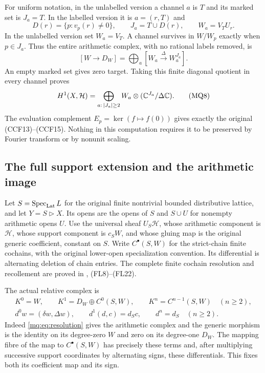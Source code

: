 For uniform notation, in the unlabelled version a channel $a$ is
$T$ and its marked set is $J_a=T$. In the labelled version it is
$a=(r,T)$ and
\[
 D(r)=\{p:v_p(r)\ne0\},\qquad J_a=T\cup D(r),
 \qquad W_a=V_TU_r.
 \tag{MQ6}\label{mq:eq:marked-set}
\]
In the unlabelled version set $W_a=V_T$. A channel survives in
$W/W_p$ exactly when $p\in J_a$. Thus the entire arithmetic
complex, with no rational labels removed, is
\[
 [W\longrightarrow D_W]
   =\bigoplus_a[W_a\xrightarrow{\Delta}W_a^{J_a}].
 \tag{MQ7}\label{mq:eq:channel-complex}
\]
An empty marked set gives zero target. Taking this finite diagonal
quotient in every channel proves
\[
 H^1(X,\mathcal H)
   =\bigoplus_{a:\,|J_a|\ge2}
       W_a\otimes(\mathbb C^{J_a}/\Delta\mathbb C).
 \tag{MQ8}\label{mq:eq:full-mixed-cohomology}
\]
The evaluation complement $E_p=\ker(f\mapsto f(0))$ gives exactly
the original (CCF13)--(CCF15). Nothing in this computation requires
it to be preserved by Fourier transform or by nonunit scaling.

\subsection{The full support extension and the arithmetic image}

Let $S=\operatorname{Spec}_{\rm Lat} L$ for the original finite nontrivial bounded
distributive lattice, and let $Y=S\triangleright X$. Its opens are
the opens of $S$ and $S\cup U$ for nonempty arithmetic opens $U$.
Use the universal sheaf $U_S\mathcal H$, whose arithmetic component
is $\mathcal H$, whose support component is $c_SW$, and whose
gluing map is the original generic coefficient, constant on $S$.
Write $C^\bullet(S,W)$ for the strict-chain finite cochains, with
the original lower-open specialization convention. Its differential
is alternating deletion of chain entries. The complete finite
cochain resolution and recollement are proved in
, (FL8)--(FL22).

The actual relative complex is
\[
 \begin{gathered}
 K^0=W,\qquad K^1=D_W\oplus C^0(S,W),\qquad
 K^n=C^{n-1}(S,W)\quad(n\ge2),\\
 d^0w=(\delta w,\Delta w),\qquad
 d^1(d,c)=d_Sc,\qquad d^n=d_S\quad(n\ge2).
 \end{gathered}
 \tag{MQ9}\label{mq:eq:relative-complex}
\]
Indeed \eqref{mq:eq:resolution} gives the arithmetic complex and
the generic morphism is the identity on its degree-zero $W$ and
zero on its degree-one $D_W$. The mapping fibre of the map to
$C^\bullet(S,W)$ has precisely these terms and, after multiplying
successive support coordinates by alternating signs, these
differentials. This fixes both its coefficient map and its sign.

